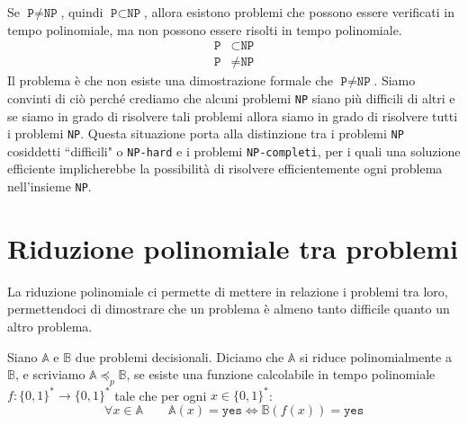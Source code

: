\begin{tcolorbox}[title = {Congettura $\texttt{P} \neq \texttt{NP}$}]
    Se $\texttt{P} \neq \texttt{NP}$, quindi $\texttt{P} \subset \texttt{NP}$, allora
    esistono problemi che possono essere verificati in tempo polinomiale, ma non possono
    essere risolti in tempo polinomiale.
    \begin{align*}
        \texttt{P} &\subset \texttt{NP} \\
        \texttt{P} &\neq \texttt{NP}
    \end{align*}
    Il problema è che non esiste una dimostrazione formale che 
    $\texttt{P} \neq \texttt{NP}$. Siamo convinti di ciò perché crediamo che alcuni
    problemi \texttt{NP} siano
    più difficili di altri e se siamo in grado di risolvere tali problemi allora 
    siamo in grado di risolvere tutti i problemi \texttt{NP}. Questa situazione
    porta alla distinzione tra i problemi \texttt{NP} cosiddetti ``difficili" o
    \texttt{NP-hard} e i problemi \texttt{NP-completi}, per i quali una soluzione
    efficiente implicherebbe la possibilità di risolvere efficientemente ogni problema
    nell'insieme \texttt{NP}.

\end{tcolorbox}
\begin{figure}[H]
    \centering
\end{figure}
\section{Riduzione polinomiale tra problemi}
La riduzione polinomiale ci permette di mettere in relazione i problemi tra loro, 
permettendoci di dimostrare che un problema è almeno tanto difficile quanto un altro
problema.
\begin{tcolorbox}[title = {Riduzione polinomiale (Karp)}]
    Siano $\mathbb{A}$ e $\mathbb{B}$ due problemi decisionali. Diciamo che $\mathbb{A}$
    si riduce polinomialmente a $\mathbb{B}$, e scriviamo $\mathbb{A} \preceq_p \mathbb{B}$,
    se esiste una funzione calcolabile in tempo polinomiale $f: \{0,1\}^* \rightarrow
    \{0,1\}^*$ tale che per ogni $x \in \{0,1\}^*$:
    \[
        \forall x \in \mathbb{A} \qquad \mathbb{A}(x) = \texttt{yes} \iff \mathbb{B}(f(x)) = \texttt{yes}
    \]
\end{tcolorbox}
